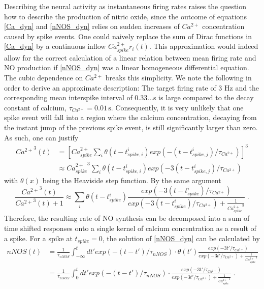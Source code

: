 \documentclass[10pt,a4paper]{article}
\begin{document}
Describing the neural activity as instantaneous firing rates raises the question how to describe the production of nitric oxide, since the outcome of equations \eqref{Ca_dyn} and \eqref{nNOS_dyn} relies on sudden increases of $Ca^{2+}$ concentration caused by spike events. One could naively replace the sum of Dirac functions in \eqref{Ca_dyn} by a continuous inflow $Ca^{2+}_{spike} r_i(t)$. This approximation would indeed allow for the correct calculation of a linear relation between mean firing rate and NO production if \eqref{nNOS_dyn} was a linear homogeneous differential equation. The cubic dependence on $Ca^{2+}$ breaks this simplicity. We note the following in order to derive an approximate description: The target firing rate of 3 Hz and the corresponding mean interspike interval of 0.33...s is large compared to the decay constant of calcium, $\tau_{Ca^{2+}} = \mathrm{0.01\,s}$. Consequently, it is very unlikely that one spike event will fall into a region where the calcium concentration, decaying from the instant jump of the previous spike event, is still significantly larger than zero. As such, one can justify
\begin{equation}
\begin{split}
{Ca^{2+}}^3(t) &= \left[ Ca^{2+}_{spike} \sum_{i} \theta(t-t^i_{spike,i}) exp(-(t-t^i_{spike,j})/\tau_{Ca^{2+}}) \right]^3 \\
&\approx {Ca^{2+}_{spike}}^3 \sum_{i} \theta(t-t^i_{spike,i}) exp(-3(t-t^i_{spike,j})/\tau_{Ca^{2+}})
\end{split} \label{cubic_approx_1}			
\end{equation}
with $\theta(x)$ being the Heaviside step function. By the same argument
\begin{equation}
\frac{{Ca^{2+}}^3(t)}{{Ca^{2+}}^3(t)+1} \approx \sum_{i} \theta(t-t^i_{spike}) \frac{exp(-3(t-t^i_{spike})/\tau_{Ca^{2+}})}{exp(-3(t-t^i_{spike})/\tau_{Ca^{2+}}) + \frac{1}{{Ca^{2+}_{spike}}^3}} \; .
\end{equation}
Therefore, the resulting rate of NO synthesis can be decomposed into a sum of time shifted responses onto a single kernel of calcium concentration as a result of a spike. For a spike at $t_{spike}=0$, the solution of \eqref{nNOS_dyn} can be calculated by
\begin{equation}
\begin{split}
nNOS(t) &= \frac{1}{\tau_{nNOS}}\int_{-\infty}^t dt' exp(-(t-t')/\tau_{nNOS})\cdot \theta(t') \frac{exp(-3t'/\tau_{Ca^{2+}})}{exp(-3t'/\tau_{Ca^{2+}}) + \frac{1}{{Ca^{2+}_{spike}}^3}} \\
&= \frac{1}{\tau_{nNOS}}\int_{0}^t dt' exp(-(t-t')/\tau_{nNOS})\cdot \frac{exp(-3t'/\tau_{Ca^{2+}})}{exp(-3t'/\tau_{Ca^{2+}}) + \frac{1}{{Ca^{2+}_{spike}}^3}}\;.
\end{split}\label{nNOS_single_sol}
\end{equation}
\end{document}
